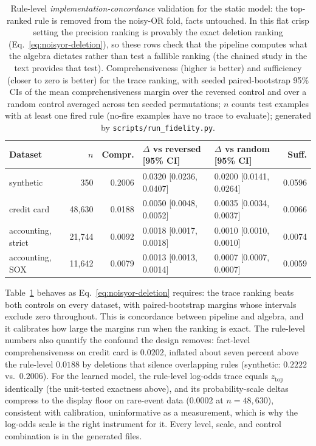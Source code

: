 \begin{table}[t]
\centering
\caption{Rule-level \emph{implementation-concordance} validation for
the static model: the top-ranked
rule is removed from the noisy-OR fold, facts untouched. In this flat
crisp setting the precision ranking is provably the exact deletion
ranking (Eq.~\ref{eq:noisyor-deletion}), so these rows check that the
pipeline computes what the algebra dictates rather than test a
fallible ranking (the chained study in the text provides that test).
Comprehensiveness (higher is better) and sufficiency (closer to zero is
better) for the trace ranking, with seeded paired-bootstrap 95\% CIs of
the mean comprehensiveness margin over the reversed control and over a
random control averaged across ten seeded permutations; $n$ counts
test examples with at least one fired rule (no-fire examples have no
trace to evaluate); generated by \texttt{scripts/run\_fidelity.py}.}
\label{tab:fidelity}
{\scriptsize
\setlength{\tabcolsep}{3.5pt}
\begin{tabular}{lrrllr}
\toprule
Dataset & $n$ & Compr. & $\Delta$ vs reversed [95\% CI] & $\Delta$ vs random [95\% CI] & Suff.\\
\midrule
synthetic & 350 & 0.2006 & 0.0320 [0.0236, 0.0407] & 0.0200 [0.0141, 0.0264] & 0.0596\\
credit card & 48{,}630 & 0.0188 & 0.0050 [0.0048, 0.0052] & 0.0035 [0.0034, 0.0037] & 0.0066\\
accounting, strict & 21{,}744 & 0.0092 & 0.0018 [0.0017, 0.0018] & 0.0010 [0.0010, 0.0010] & 0.0074\\
accounting, SOX & 11{,}642 & 0.0079 & 0.0013 [0.0013, 0.0014] & 0.0007 [0.0007, 0.0007] & 0.0059\\
\bottomrule
\end{tabular}
}
\end{table}

Table~\ref{tab:fidelity} behaves as
Eq.~\eqref{eq:noisyor-deletion} requires: the trace ranking beats both
controls on every dataset, with paired-bootstrap margins whose
intervals exclude zero throughout. This is concordance between
pipeline and
algebra, and it calibrates how large the margins run when the
ranking is exact. The rule-level
numbers also quantify the confound the design removes: fact-level
comprehensiveness on credit card is $0.0202$, inflated about seven
percent above the rule-level $0.0188$ by deletions that silence
overlapping rules (synthetic: $0.2222$ vs.\ $0.2006$). For the learned
model, the rule-level log-odds trace equals $z_{\text{top}}$
identically (the unit-tested exactness above), and its
probability-scale deltas compress to the display floor on rare-event
data ($0.0002$ at $n{=}48{,}630$), consistent with calibration,
uninformative as a measurement, which is why the log-odds scale is the
right instrument for it. Every level, scale, and control combination
is in the generated files.

